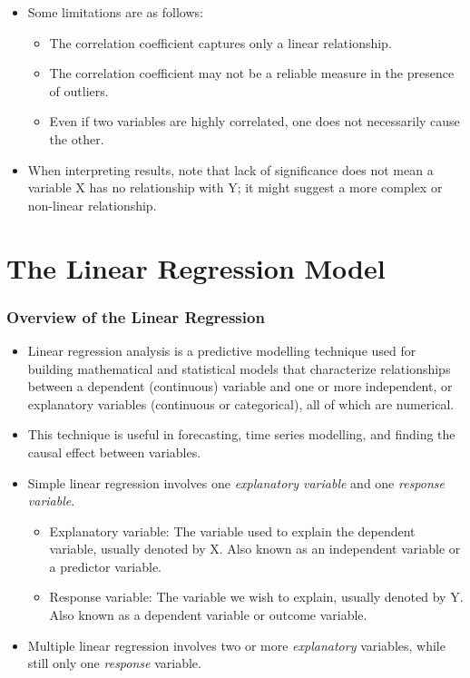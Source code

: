 \documentclass[
  letterpaper,
  DIV=11,
  numbers=noendperiod]{scrreprt}
\providecommand{\tightlist}{%
  \setlength{\itemsep}{0pt}\setlength{\parskip}{0pt}}\usepackage{longtable,booktabs,array}
\begin{document}
\begin{itemize}
\tightlist
\item
  Some limitations are as follows:

  \begin{itemize}
  \tightlist
  \item
    The correlation coefficient captures only a linear relationship.
  \item
    The correlation coefficient may not be a reliable measure in the
    presence of outliers.
  \item
    Even if two variables are highly correlated, one does not
    necessarily cause the other.
  \end{itemize}
\item
  When interpreting results, note that lack of significance does not
  mean a variable X has no relationship with Y; it might suggest a more
  complex or non-linear relationship.
\end{itemize}


\chapter{The Linear Regression Model}\label{the-linear-regression-model}

\subsection{Overview of the Linear
Regression}\label{overview-of-the-linear-regression}

\begin{itemize}
\tightlist
\item
  Linear regression analysis is a predictive modelling technique used
  for building mathematical and statistical models that characterize
  relationships between a dependent (continuous) variable and one or
  more independent, or explanatory variables (continuous or
  categorical), all of which are numerical.
\item
  This technique is useful in forecasting, time series modelling, and
  finding the causal effect between variables.
\item
  Simple linear regression involves one \emph{explanatory variable} and
  one \emph{response variable}.

  \begin{itemize}
  \tightlist
  \item
    Explanatory variable: The variable used to explain the dependent
    variable, usually denoted by X. Also known as an independent
    variable or a predictor variable.
  \item
    Response variable: The variable we wish to explain, usually denoted
    by Y. Also known as a dependent variable or outcome variable.
  \end{itemize}
\item
  Multiple linear regression involves two or more \emph{explanatory}
  variables, while still only one \emph{response} variable.
\end{itemize}
\end{document}
